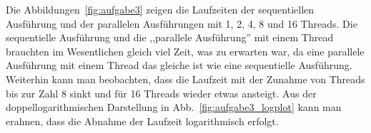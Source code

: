 Die Abbildungen~\ref{fig:aufgabe3} zeigen die Laufzeiten der sequentiellen Ausführung und der parallelen Ausführungen mit 1, 2, 4, 8 und 16 Threads. Die sequentielle Ausführung und die ,,parallele Ausführung'' mit einem Thread brauchten im Wesentlichen gleich viel Zeit, was zu erwarten war, da eine parallele Ausführung mit einem Thread das gleiche ist wie eine sequentielle Ausführung. Weiterhin kann man beobachten, dass die Laufzeit mit der Zunahme von Threads bis zur Zahl 8 sinkt und für 16 Threads wieder etwas ansteigt. Aus der doppellogarithmischen Darstellung in Abb.~\ref{fig:aufgabe3_logplot} kann man erahnen, dass die Abnahme der Laufzeit logarithmisch erfolgt.